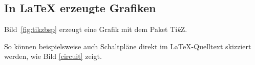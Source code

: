 \lipsum[2]

\subsection{In \LaTeX{} erzeugte Grafiken}

Bild~\ref{fig:tikzbsp} erzeugt eine Grafik mit dem Paket Ti\textit{k}Z.

\begin{figure}[!htbp]
\end{figure}

So können beispielsweise auch Schaltpläne direkt im \LaTeX-Quelltext skizziert werden, wie Bild \ref{circuit} zeigt.

